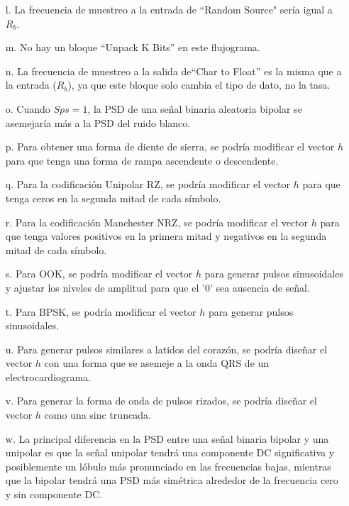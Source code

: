 \documentclass{journal}[IEEEtran, twocolumn]             %
\begin{document}
\begin{multicols}{2}
\begin{itemize}
    \item[l.] La frecuencia de muestreo a la entrada de ``Random Source" sería igual a \(R_b\).
    
    \item[m.] No hay un bloque ``Unpack K Bits''  en este flujograma.
    
    \item[n.] La frecuencia de muestreo a la salida de``Char to Float''  es la misma que a la entrada (\(R_b\)), ya que este bloque solo cambia el tipo de dato, no la tasa.
    
    \item[o.] Cuando \(Sps = 1\), la PSD de una señal binaria aleatoria bipolar se asemejaría más a la PSD del ruido blanco.
    
    \item[p.] Para obtener una forma de diente de sierra, se podría modificar el vector \(h\) para que tenga una forma de rampa ascendente o descendente.
    
    \item[q.] Para la codificación Unipolar RZ, se podría modificar el vector \(h\) para que tenga ceros en la segunda mitad de cada símbolo.
    
    \item[r.] Para la codificación Manchester NRZ, se podría modificar el vector \(h\) para que tenga valores positivos en la primera mitad y negativos en la segunda mitad de cada símbolo.
    
    \item[s.] Para OOK, se podría modificar el vector \(h\) para generar pulsos sinusoidales y ajustar los niveles de amplitud para que el '0' sea ausencia de señal.
    
    \item[t.] Para BPSK, se podría modificar el vector \(h\) para generar pulsos sinusoidales.
    
    \item[u.] Para generar pulsos similares a latidos del corazón, se podría diseñar el vector \(h\) con una forma que se asemeje a la onda QRS de un electrocardiograma.
    
    \item[v.] Para generar la forma de onda de pulsos rizados, se podría diseñar el vector \(h\) como una sinc truncada.
    
    \item[w.] La principal diferencia en la PSD entre una señal binaria bipolar y una unipolar es que la señal unipolar tendrá una componente DC significativa y posiblemente un lóbulo más pronunciado en las frecuencias bajas, mientras que la bipolar tendrá una PSD más simétrica alrededor de la frecuencia cero y sin componente DC.
\end{itemize}


\end{multicols}
\end{document}
